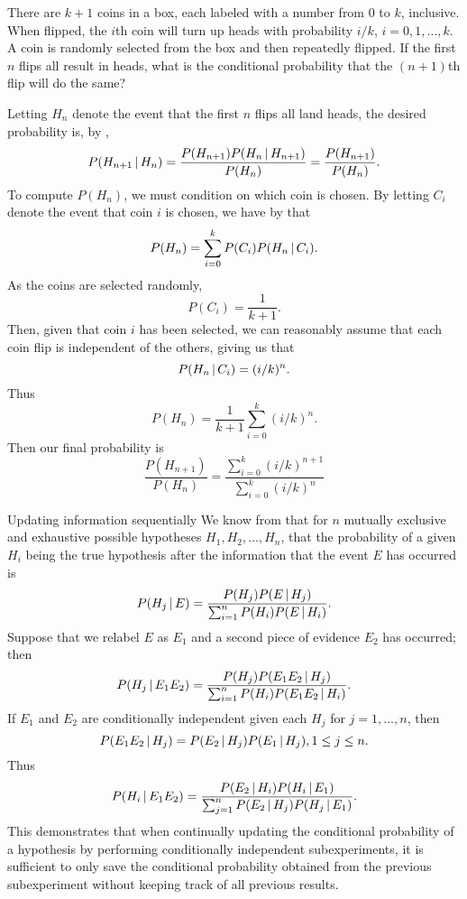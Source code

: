 \begin{changebar}
    \begin{example}
        There are $k+1$ coins in a box, each labeled with a number from $0$ to $k$, inclusive. When flipped, the $i$th coin will turn up heads with probability $i/k$, $i = 0, 1, \dots, k$. A coin is randomly selected from the box and then repeatedly flipped. If the first $n$ flips all result in heads, what is the conditional probability that the $(n + 1)$th flip will do the same?
    \end{example}
    \begin{solution}
        Letting $H_n$ denote the event that the first $n$ flips all land heads, the desired probability is, by , \[
            P(H_{n+1} \,\vert\, H_n) = \frac{P(H_{n+1})P(H_n \,\vert\, H_{n+1})}{P(H_n)} = \frac{P(H_{n+1})}{P(H_n)}.
        \] To compute $P(H_n)$, we must condition on which coin is chosen. By letting $C_i$ denote the event that coin $i$ is chosen, we have by  that \[
            P(H_n) = \sum^{k}_{i = 0}P(C_i)P(H_n \,\vert\, C_i).
        \] As the coins are selected randomly, \[
            P(C_i) = \frac{1}{k + 1}.    
        \] Then, given that coin $i$ has been selected, we can reasonably assume that each coin flip is independent of the others, giving us that \[
            P(H_n \,\vert\, C_i) = (i/k)^n.    
        \] Thus \[
            P(H_n) = \frac{1}{k+1}\sum^k_{i = 0}(i/k)^n.    
        \] Then our final probability is \[
            \frac{P(H_{n+1})}{P(H_n)} = \frac{\sum^k_{i = 0}(i/k)^{n+1}}{\sum^k_{i=0}(i/k)^n}
        \]
    \end{solution}
\end{changebar}
\begin{bdef}{Updating information sequentially}\label{sequentialupdate}
    We know from  that for $n$ mutually exclusive and exhaustive possible hypotheses $H_1, H_2, \dots, H_n$, that the probability of a given $H_i$ being the true hypothesis after the information that the event $E$ has occurred is \[
        P(H_j \,\vert\, E) = \frac{P(H_j)P(E \,\vert\, H_j)}{\sum^n_{i = 1} P(H_i)P(E \,\vert\, H_i)}.    
    \] Suppose that we relabel $E$ as $E_1$ and a second piece of evidence $E_2$ has occurred; then \[
        P(H_j \,\vert\, E_1E_2) = \frac{P(H_j)P(E_1E_2 \,\vert\, H_j)}{\sum^n_{i = 1} P(H_i)P(E_1E_2 \,\vert\, H_i)}.    
    \] If $E_1$ and $E_2$ are conditionally independent given each $H_j$ for $j = 1,\dots, n$, then \[
        P(E_1E_2 \,\vert\, H_j) = P(E_2 \,\vert\, H_j)P(E_1 \,\vert\, H_j), 1 \leq j \leq n.     
    \] Thus \[
        P(H_i \,\vert\, E_1E_2) = \frac{P(E_2 \,\vert\, H_i)P(H_i \,\vert\, E_1)}{\sum^n_{j = 1}P(E_2 \,\vert\, H_j)P(H_j \,\vert\, E_1)}.    
    \] This demonstrates that when continually updating the conditional probability of a hypothesis by performing conditionally independent subexperiments, it is sufficient to only save the conditional probability obtained from the previous subexperiment without keeping track of all previous results.
\end{bdef}